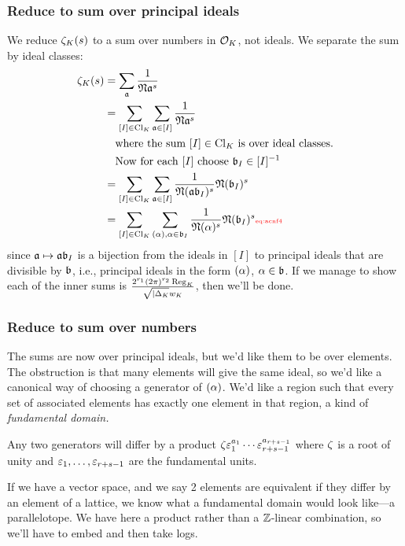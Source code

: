 \subsubsection{Reduce to sum over principal ideals}
We reduce $\zeta_K(s)$ to a sum over numbers in $\mathcal{O}_K$, not ideals. We separate the sum by ideal classes:
\begin{align}
\nonumber
\ze_K(s)&=\sum_{\ma} \rc{\fN \ma^s}\\
\nonumber
&=\sum_{[I]\in\Cl_K} \sum_{\ma \in [I]}\rc{\fN\ma^s}\\
\nonumber
&\quad \text{where the sum $[I]\in \Cl_K$ is over ideal classes.}\\
\nonumber
&\quad \text{Now for each $[I]$ choose $\mb_I\in [I]^{-1}$}\\
\nonumber
&=\sum_{[I]\in\Cl_K} \sum_{\ma \in [I]}\rc{\fN(\ma\mb_I)^s}\fN(\mb_I)^s\\
&=\sum_{[I]\in\Cl_K} \sum_{(\al),\al\in \mb_I}\rc{\fN(\al)^s}\fN(\mb_I)^s\llabel{eq:acnf4}
\end{align}
since $\mathfrak{a}\mapsto \mathfrak{a}\mathfrak{b}_I$ is a bijection from the ideals in $[I]$ to principal ideals that are divisible by $\mathfrak{b}$, i.e., principal ideals in the form $(\alpha)$, $\alpha\in \mathfrak{b}$. If we manage to show each of the inner sums is $\frac{2^{r_1}(2\pi)^{r_2}\operatorname{Reg}_K}{\sqrt{|\Delta_K}w_K}$, then we'll be done.

\subsubsection{Reduce to sum over numbers}
The sums are now over principal ideals, but we'd like them to be over elements. The obstruction is that many elements will give the same ideal, so we'd like a canonical way of choosing a generator of $(\alpha)$. We'd like a region such that every set of associated elements has exactly one element in that region, a kind of {\it fundamental domain.}

Any two generators will differ by a product $\zeta\varepsilon_1^{a_1}\cdots \varepsilon_{r+s-1}^{a_{r+s-1}}$ where $\zeta$ is a root of unity and $\varepsilon_1,\ldots, \varepsilon_{r+s-1}$ are the fundamental units. 

If we have a vector space, and we say 2 elements are equivalent if they differ by an element of a lattice, we know what a fundamental domain would look like---a parallelotope. We have here a product rather than a $\mathbb{Z}$-linear combination, so we'll have to embed and then take logs. 

